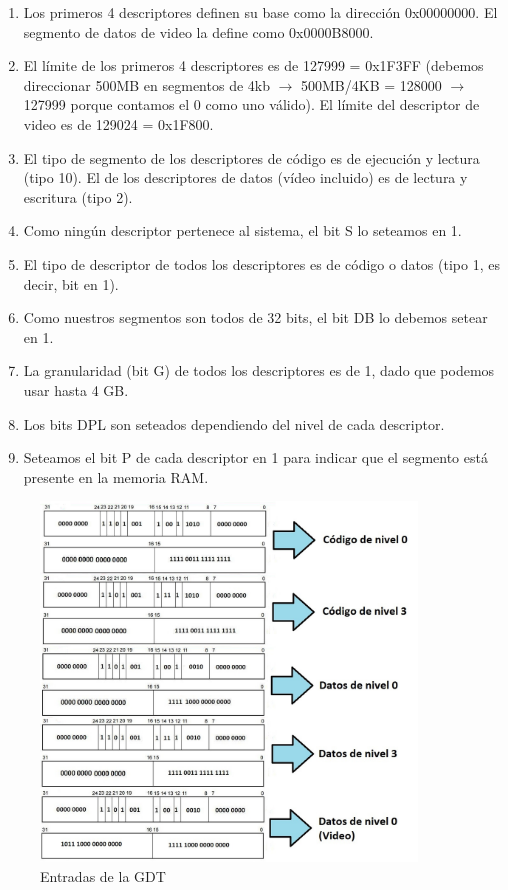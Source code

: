 \documentclass[a4paper]{article}
\begin{document}
\begin{enumerate}

\item Los primeros 4 descriptores definen su base como la dirección 0x00000000. El segmento de datos de video la define como 0x0000B8000.

\item El límite de los primeros 4 descriptores es de 127999 = 0x1F3FF (debemos direccionar 500MB en segmentos de 4kb $\rightarrow$ 500MB/4KB = 128000 $\rightarrow$ 127999 porque contamos el 0 como uno válido). El límite del descriptor de video es de 129024 = 0x1F800.

\item El tipo de segmento de los descriptores de código es de ejecución y lectura (tipo 10). El de los descriptores de datos (vídeo incluido) es de lectura y escritura (tipo 2).

\item Como ningún descriptor pertenece al sistema, el bit S lo seteamos en 1.


\item El tipo de descriptor de todos los descriptores es de código o datos (tipo 1, es decir, bit en 1).

\item Como nuestros segmentos son todos de 32 bits, el bit DB lo debemos setear en 1.

\item La granularidad (bit G) de todos los descriptores es de 1, dado que podemos usar hasta 4 GB.

\item Los bits DPL son seteados dependiendo del nivel de cada descriptor.

\item Seteamos el bit P de cada descriptor en 1 para indicar que el segmento está presente en la memoria RAM.

\end{enumerate}

\begin{figure}[ht!]
\centering
\includegraphics[width=100mm]{imagenes/GDTEJERCICIO1.jpg}
\caption{Entradas de la GDT}
\end{figure}
\end{document}
